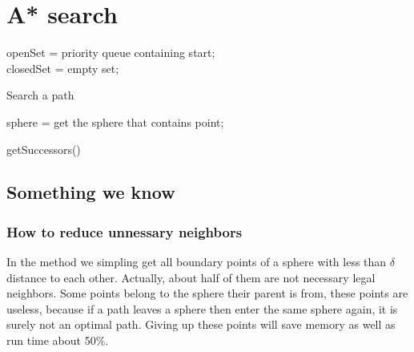 \documentclass{article}
\begin{document}
\section{A* search}
  \label{Path searching algorithm}
  \begin{algorithm}[H]
  openSet = priority queue containing start; \\
  closedSet = empty set; \\
  \caption{ Search a path }
  \end{algorithm}


 \begin{algorithm}
  sphere = get the sphere that contains point; \\
 \caption{ getSuccessors()\label{IR} }
 \end{algorithm}
 
  \subsection{Something we know}
    \subsubsection{How to reduce unnessary neighbors}
      In the method we simpling get all boundary points of a sphere with less than $\delta$ distance to each other. Actually, about half of them are not necessary legal neighbors. Some points belong to the sphere their parent is from, these points are useless, because if a path leaves a sphere then enter the same sphere again, it is surely not an optimal path. Giving up these points will save memory as well as run time about 50\%. 
\end{document}
